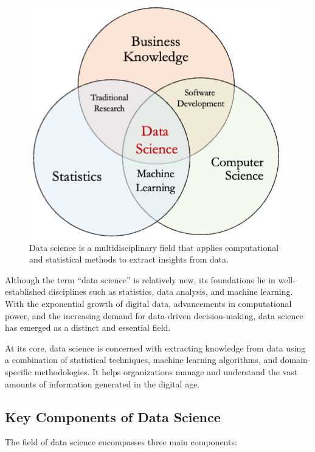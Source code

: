 \documentclass[
]{book}
\theoremstyle{definition}
\theoremstyle{definition}
\theoremstyle{definition}
\theoremstyle{definition}
\theoremstyle{remark}
\begin{document}
\begin{figure}

{\centering \includegraphics[width=0.5\linewidth]{images/data_science} 

}

\caption{Data science is a multidisciplinary field that applies computational and statistical methods to extract insights from data.}\label{fig:Data-Science}
\end{figure}

Although the term ``data science'' is relatively new, its foundations lie in well-established disciplines such as statistics, data analysis, and machine learning. With the exponential growth of digital data, advancements in computational power, and the increasing demand for data-driven decision-making, data science has emerged as a distinct and essential field.

At its core, data science is concerned with extracting knowledge from data using a combination of statistical techniques, machine learning algorithms, and domain-specific methodologies. It helps organizations manage and understand the vast amounts of information generated in the digital age.

\subsection*{Key Components of Data Science}\label{key-components-of-data-science}

The field of data science encompasses three main components:
\end{document}
